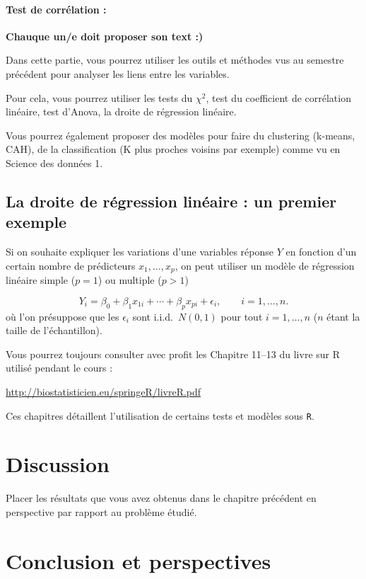 \documentclass[mstat,12pt]{unswthesis}
\begin{document}
\subsubsection{Test de corrélation :}\label{test-de-corruxe9lation}

\textbf{Chauque un/e doit proposer son text :) }

Dans cette partie, vous pourrez utiliser les outils et méthodes vus au
semestre précédent pour analyser les liens entre les variables.

Pour cela, vous pourrez utiliser les tests du \(\chi^2\), test du
coefficient de corrélation linéaire, test d'Anova, la droite de
régression linéaire.

Vous pourrez également proposer des modèles pour faire du clustering
(k-means, CAH), de la classification (K plus proches voisins par
exemple) comme vu en Science des données 1.

\section{La droite de régression linéaire : un premier
exemple}\label{la-droite-de-ruxe9gression-linuxe9aire-un-premier-exemple}

Si on souhaite expliquer les variations d'une variables réponse \(Y\) en
fonction d'un certain nombre de prédicteurs \(x_1,\ldots,x_p\), on peut
utiliser un modèle de régression linéaire simple (\(p=1\)) ou multiple
(\(p>1\))

\[
Y_i = \beta_0 + \beta_1 x_{1i} + \cdots +\beta_p x_{pi} + \epsilon_i, \qquad i=1,\ldots,n.
\] où l'on présuppose que les \(\epsilon_i\) sont i.i.d.~\(N(0,1)\) pour
tout \(i=1,\ldots,n\) (\(n\) étant la taille de l'échantillon).

Vous pourrez toujours consulter avec profit les Chapitre 11--13 du livre
sur R utilisé pendant le cours :

\url{http://biostatisticien.eu/springeR/livreR.pdf}

Ces chapitres détaillent l'utilisation de certains tests et modèles sous
\texttt{R}.

\chapter{Discussion}\label{discussion}

Placer les résultats que vous avez obtenus dans le chapitre précédent en
perspective par rapport au problème étudié.

\chapter{Conclusion et perspectives}\label{conclusion-et-perspectives}
\end{document}
